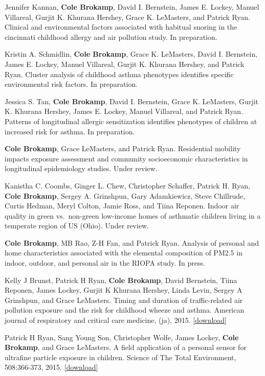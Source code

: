 
Jennifer Kannan, \textbf{Cole Brokamp}, David I. Bernstein, James E.
Lockey, Manuel Villareal, Gurjit K. Khurana Hershey, Grace K. LeMasters,
and Patrick Ryan. Clinical and environmental factors associated with
habitual snoring in the cincinnati childhood allergy and air pollution
study. In preparation.

Kristin A. Schmidlin, \textbf{Cole Brokamp}, Grace K. LeMasters, David
I. Bernstein, James E. Lockey, Manuel Villareal, Gurjit K. Khurana
Hershey, and Patrick Ryan. Cluster analysis of childhood asthma
phenotypes identifies specific environmental risk factors. In
preparation.

Jessica S. Tan, \textbf{Cole Brokamp}, David I. Bernstein, Grace K.
LeMasters, Gurjit K. Khurana Hershey, James E. Lockey, Manuel Villareal,
and Patrick Ryan. Patterns of longitudinal allergic sensitization
identifies phenotypes of children at increased risk for asthma. In
preparation.

\textbf{Cole Brokamp}, Grace LeMasters, and Patrick Ryan. Residential
mobility impacts exposure assessment and community socioeconomic
characteristics in longitudinal epidemiology studies. Under review.

Kanistha C. Coombs, Ginger L. Chew, Christopher Schaffer, Patrick H.
Ryan, \textbf{Cole Brokamp}, Sergey A. Grinshpun, Gary Adamkiewicz,
Steve Chillrude, Curtis Hedman, Meryl Colton, Jamie Ross, and Tiina
Reponen. Indoor air quality in green vs.~non-green low-income homes of
asthmatic children living in a temperate region of US (Ohio). Under
review.

\textbf{Cole Brokamp}, MB Rao, Z-H Fan, and Patrick Ryan. Analysis of
personal and home characteristics associated with the elemental
composition of PM2.5 in indoor, outdoor, and personal air in the RIOPA
study. In press.

Kelly J Brunst, Patrick H Ryan, \textbf{Cole Brokamp}, David Bernstein,
Tiina Reponen, James Lockey, Gurjit K Khurana Hershey, Linda Levin,
Sergey A Grinshpun, and Grace LeMasters. Timing and duration of
traffic-related air pollution exposure and the risk for childhood wheeze
and asthma. American journal of respiratory and critical care medicine,
(ja), 2015.
\href{https://github.com/cole-brokamp/cole-brokamp.github.io/raw/master/publications/rccm\%252E201407-1314oc.pdf}{{[}download{]}}

Patrick H Ryan, Sang Young Son, Christopher Wolfe, James Lockey,
\textbf{Cole Brokamp}, and Grace LeMasters. A field application of a
personal sensor for ultrafine particle exposure in children. Science of
The Total Environment, 508:366-373, 2015.
\href{https://github.com/cole-brokamp/cole-brokamp.github.io/raw/master/publications/1-s2.0-S0048969714016556-main.pdf}{{[}download{]}}

